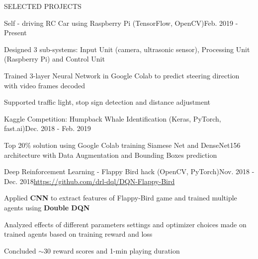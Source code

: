 \documentclass{resume} %
\begin{document}

\begin{rSection}{SELECTED PROJECTS}

\begin{rSubsection}{Self - driving RC Car using Raspberry Pi (TensorFlow, OpenCV)}{Feb. 2019 - Present}{}{}
\item Designed 3 sub-systems: Input Unit (camera, ultrasonic sensor), Processing Unit (Raspberry Pi) and Control Unit
\item Trained 3-layer Neural Network in Google Colab to predict steering direction with video frames decoded
\item Supported traffic light, stop sign detection and distance adjustment
\end{rSubsection}


\begin{rSubsection}{Kaggle Competition: Humpback Whale Identification (Keras, PyTorch, fast.ai)}{Dec. 2018 - Feb. 2019}{}{}
\item Top 20\% solution using Google Colab training Siamese Net and DenseNet156 architecture with Data Augmentation and Bounding Boxes prediction
\end{rSubsection}


\begin{rSubsection}{Deep Reinforcement Learning - Flappy Bird hack (OpenCV, PyTorch)}{Nov. 2018 - Dec. 2018}{\url{https://github.com/drl-dql/DQN-Flappy-Bird}}{}
\item Applied \textbf{CNN} to extract features of Flappy-Bird game and trained multiple agents using \textbf{Double DQN}
\item Analyzed effects of different parameters settings and optimizer choices made on trained agents based on training reward and loss
\item Concluded $\sim 30$ reward scores and 1-min playing duration
\end{rSubsection}



\end{rSection}
\end{document}
